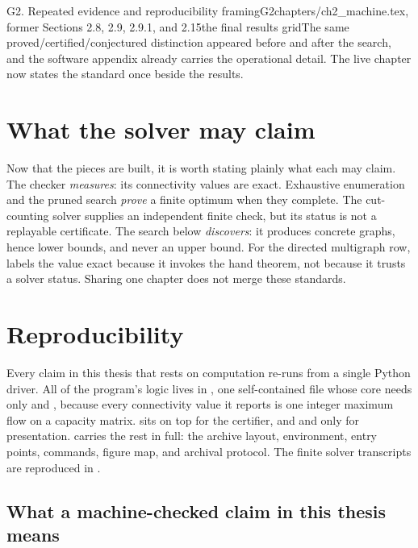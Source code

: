 \begin{offcutrewrite}{G2. Repeated evidence and reproducibility framing}{G2}{chapters/ch2\_machine.tex, former Sections 2.8, 2.9, 2.9.1, and 2.15}{the final results grid}{The same proved/certified/conjectured distinction appeared before and after the search, and the software appendix already carries the operational detail. The live chapter now states the standard once beside the results.}
\section{What the solver may claim}

Now that the pieces are built, it is worth stating plainly what each may claim. The checker \emph{measures}: its connectivity values are exact. Exhaustive enumeration and the pruned search \emph{prove} a finite optimum when they complete. The cut-counting solver supplies an independent finite check, but its status is not a replayable certificate. The search below \emph{discovers}: it produces concrete graphs, hence lower bounds, and never an upper bound. For the directed multigraph row,  labels the value exact because it invokes the hand theorem, not because it trusts a solver status. Sharing one chapter does not merge these standards.

\section{Reproducibility}

Every claim in this thesis that rests on computation re-runs from a single Python driver. All of the program's logic lives in , one self-contained file whose core needs only  and , because every connectivity value it reports is one  integer maximum flow on a capacity matrix.  sits on top for the certifier, and  and  only for presentation.  carries the rest in full: the archive layout, environment, entry points, commands, figure map, and archival protocol. The finite solver transcripts are reproduced in .

\subsection{What a machine-checked claim in this thesis means}


\end{offcutrewrite}
